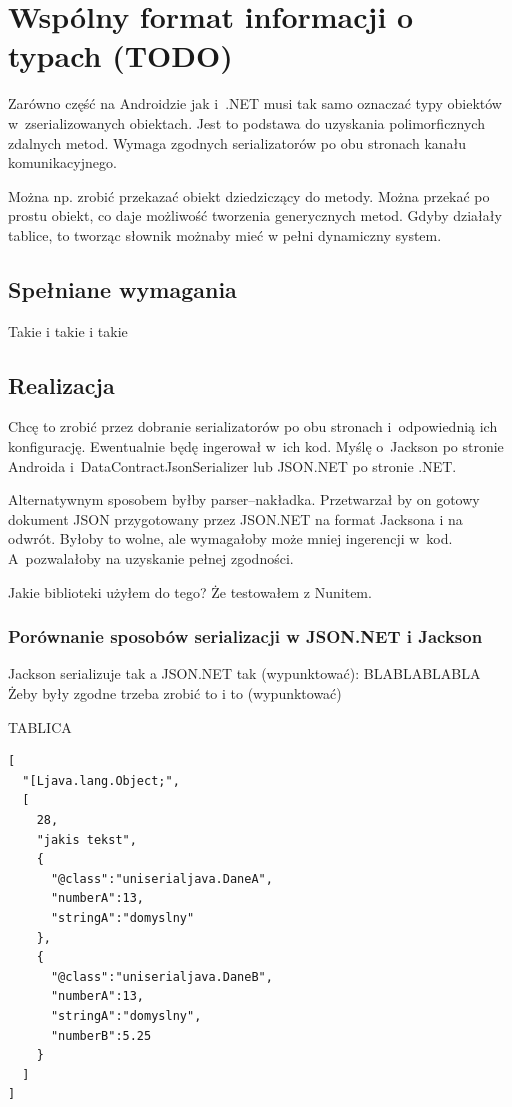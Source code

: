 \section{Wspólny format informacji o typach (TODO)}
Zarówno część na Androidzie jak i~.NET musi tak samo oznaczać typy obiektów w~zserializowanych obiektach.
Jest to podstawa do uzyskania polimorficznych zdalnych metod.
Wymaga zgodnych serializatorów po obu stronach kanału komunikacyjnego.

Można np. zrobić przekazać obiekt dziedziczący do metody. Można przekać po prostu obiekt, co daje możliwość tworzenia generycznych metod. Gdyby działały tablice, to tworząc słownik możnaby mieć w pełni dynamiczny system.

\subsection{Spełniane wymagania}
Takie i takie i takie


\subsection{Realizacja}
Chcę to zrobić przez dobranie serializatorów po obu stronach i~odpowiednią ich konfigurację. Ewentualnie będę ingerował w~ich kod.
Myślę o~Jackson po stronie Androida i~DataContractJsonSerializer lub JSON.NET po stronie .NET\@.

Alternatywnym sposobem byłby parser--nakładka. Przetwarzał by on gotowy dokument JSON przygotowany przez JSON.NET na format Jacksona i na odwrót. Byłoby to wolne, ale wymagałoby może mniej ingerencji w~kod. A~pozwalałoby na uzyskanie pełnej zgodności.

Jakie biblioteki użyłem do tego? Że testowałem z Nunitem.

\subsubsection{Porównanie sposobów serializacji w JSON.NET i Jackson}
Jackson serializuje tak a JSON.NET tak (wypunktować):
BLABLABLABLA
Żeby były zgodne trzeba zrobić to i to (wypunktować)

TABLICA
\begin{lstlisting}[float, frame=single, caption={Jackson daje.}, label=kod:jackson-serilization]
[
  "[Ljava.lang.Object;",
  [
    28,
    "jakis tekst",
    {
      "@class":"uniserialjava.DaneA",
      "numberA":13,
      "stringA":"domyslny"
    },
    {
      "@class":"uniserialjava.DaneB",
      "numberA":13,
      "stringA":"domyslny",
      "numberB":5.25
    }
  ]
]
\end{lstlisting}

